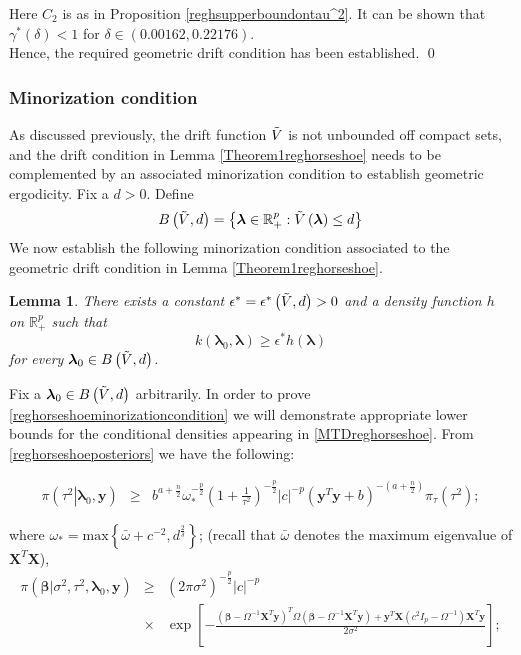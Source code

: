 \documentclass[noinfoline,11pt]{imsart}
\numberwithin{equation}{section}
\theoremstyle{plain}
\newtheorem{lem}{Lemma}[section]
\newcommand{\y}{\mathbf{y}}
\newcommand{\X}{\mathbf{X}}
\newcommand{\bl}{\boldsymbol{\lambda}}
\begin{document}
\noindent
Here $C_2$ is as in Proposition \ref{reghsupperboundontau^2}. It can be shown that $\gamma^* \left( \delta \right) < 1$ for $\delta\in (0.00162, 0.22176) $. \\
Hence, the required geometric drift condition has been established. \qed 
\subsubsection{Minorization condition}\label{reghorseshoeminorization}

\noindent
As discussed previously, the drift function $\Tilde{V}$ is not unbounded off compact sets, and the drift condition in Lemma \ref{Theorem1reghorseshoe} needs to be complemented by an associated minorization condition to establish geometric ergodicity. Fix a $d>0$. Define
\begin{equation}\label{reghorseshoeminorizationset}
    B \left( \Tilde{V},d \right) = \left\{\bl\in\mathbb{R}_+^p:\Tilde{V}\left(\bl\right)\leq d\right\}
\end{equation}
We now establish the following minorization condition associated to the geometric drift condition in Lemma \ref{Theorem1reghorseshoe}.
\begin{lem}\label{Theorem2reghorseshoe}
There exists a constant $\epsilon^*=\epsilon^*\left(\Tilde{V},d\right)>0$ and a density function $h$ on $\mathbb{R}_+^p$ such that
\begin{equation}\label{reghorseshoeminorizationcondition}
   k\left(\bl_0,\bl\right)\geq \epsilon^* h\left(\bl\right) 
\end{equation}
for every $\bl_0\in B\left(\Tilde{V},d\right)$.
\end{lem}
\proof Fix a $\bl_0\in B\left(\Tilde{V},d\right)$ arbitrarily. In order to prove \eqref{reghorseshoeminorizationcondition} we will demonstrate appropriate lower bounds for the conditional densities appearing in \eqref{MTDreghorseshoe}. From \eqref{reghorseshoeposteriors} we have the following:

\begin{eqnarray*}
 \pi\left(\left.\tau^2\right|\bl_0,\y\right)&\geq& b^{a+\frac{n}{2}} \omega_*^{-\frac{p}{2}}\left(1+\frac{1}{\tau^2}\right)^{-\frac{p}{2}}|c|^{-p}\left(\y^T\y+b\right)^{-\left(a+\frac{n}{2}\right)}\pi_\tau\left(\tau^2\right);
\end{eqnarray*}

\noindent
where $\omega_*=\text{max}\left\{\bar{\omega}+c^{-2},d^{\frac{2}{\delta}}\right\}$; (recall that $\bar \omega$ denotes the maximum eigenvalue of $\X^T\X$),
\begin{eqnarray*}
 \pi\left(\left.\boldsymbol{\beta}\right|\sigma^2,\tau^2,\bl_0,\y\right)&\geq& \left(2\pi\sigma^2\right)^{-\frac{p}{2}}\left|c\right|^{-p}\\
 &\times&\exp{\left[-\frac{\left(\boldsymbol{\beta}-\Omega^{-1}\X^T\y\right)^T\Omega\left(\boldsymbol{\beta}-\Omega^{-1}\X^T\y\right)+\y^T\X\left(c^2I_p-\Omega^{-1}\right)\X^T\y}{2\sigma^2}\right]}; 
\end{eqnarray*}
\end{document}
